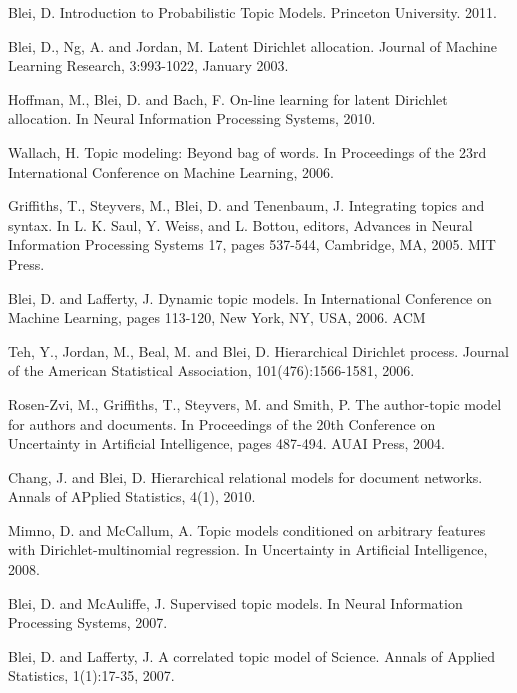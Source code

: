 \documentclass[conference]{IEEEtran}
\begin{document}
\begin{thebibliography}{1}

Blei, D. Introduction to Probabilistic Topic Models. Princeton University. 2011.

Blei, D., Ng, A. and Jordan, M. Latent Dirichlet allocation. Journal of Machine Learning Research, 3:993-1022, January 2003.

Hoffman, M., Blei, D. and Bach, F. On-line learning for latent Dirichlet allocation. In Neural Information Processing Systems, 2010.

Wallach, H. Topic modeling: Beyond bag of words. In Proceedings of the 23rd International Conference on Machine Learning, 2006.

Griffiths, T., Steyvers, M., Blei, D. and Tenenbaum, J. Integrating topics and syntax. In L. K. Saul, Y. Weiss, and L. Bottou, editors, Advances in Neural Information Processing Systems 17, pages 537-544, Cambridge, MA, 2005. MIT Press.

Blei, D. and Lafferty, J. Dynamic topic models. In International Conference on Machine Learning, pages 113-120, New York, NY, USA, 2006. ACM

Teh, Y., Jordan, M., Beal, M. and Blei, D. Hierarchical Dirichlet process. Journal of the American Statistical Association, 101(476):1566-1581, 2006.

Rosen-Zvi, M., Griffiths, T., Steyvers, M. and Smith, P. The author-topic model for authors and documents. In Proceedings of the 20th Conference on Uncertainty in Artificial Intelligence, pages 487-494. AUAI Press, 2004.

Chang, J. and Blei, D. Hierarchical relational models for document networks. Annals of APplied Statistics, 4(1), 2010.

Mimno, D. and McCallum, A. Topic models conditioned on arbitrary features with Dirichlet-multinomial regression. In Uncertainty in Artificial Intelligence, 2008.

Blei, D. and McAuliffe, J. Supervised topic models. In Neural Information Processing Systems, 2007.

Blei, D. and Lafferty, J. A correlated topic model of Science. Annals of Applied Statistics, 1(1):17-35, 2007.


\end{thebibliography}
\end{document}
